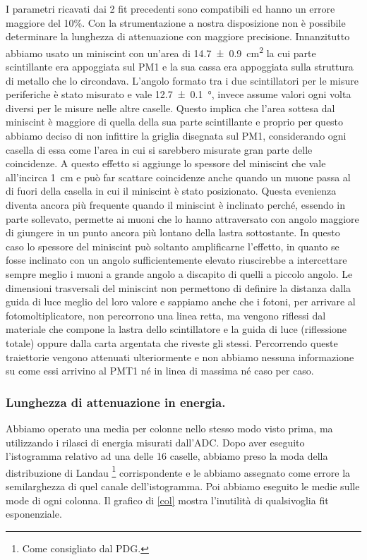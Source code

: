 I parametri ricavati dai 2 fit precedenti sono compatibili ed hanno un errore maggiore del 10\%. Con la strumentazione a nostra disposizione non è possibile determinare la lunghezza di attenuazione con maggiore precisione. Innanzitutto abbiamo usato un miniscint con un'area di \SI{14.7\pm0.9}{cm^2} la cui parte scintillante era appoggiata sul PM1 e la sua cassa  era appoggiata sulla struttura di metallo che lo circondava. L'angolo formato tra i due scintillatori per le misure periferiche è stato misurato e vale \SI{12.7\pm0.1}{\degree}, invece assume valori ogni volta diversi per le misure nelle altre caselle. Questo implica che l'area sottesa dal miniscint è maggiore di quella della sua parte scintillante e proprio per questo abbiamo deciso di non infittire la griglia disegnata sul PM1, considerando ogni casella di essa come l'area in cui si sarebbero misurate gran parte delle coincidenze. A questo effetto si aggiunge lo spessore del miniscint che vale all'incirca \SI{1}{cm} e può far scattare coincidenze anche quando un muone passa al di fuori della casella in cui il miniscint è stato posizionato. Questa evenienza diventa ancora più frequente quando il miniscint è inclinato perché, essendo in parte sollevato, permette ai muoni che lo hanno attraversato con angolo maggiore di giungere in un punto ancora più lontano della lastra sottostante. In questo caso lo spessore del miniscint può soltanto amplificarne l'effetto, in quanto se fosse inclinato con un angolo sufficientemente elevato riuscirebbe a intercettare sempre meglio  i muoni a grande angolo a discapito di quelli a piccolo angolo.
Le dimensioni trasversali del miniscint non permettono di definire la distanza dalla guida di luce meglio del loro valore e sappiamo anche che i fotoni, per arrivare al fotomoltiplicatore,  non percorrono una linea retta, ma vengono riflessi dal materiale che compone la lastra dello scintillatore e la guida di luce (riflessione totale) oppure dalla carta argentata che riveste gli stessi. Percorrendo queste traiettorie vengono attenuati ulteriormente e non abbiamo nessuna informazione su come essi arrivino al PMT1 né in linea di massima né caso per caso.

\subsubsection{Lunghezza di attenuazione in energia.}

Abbiamo operato una media per colonne nello stesso modo visto prima, ma utilizzando i rilasci di energia misurati dall'ADC. Dopo aver eseguito l'istogramma relativo ad una delle 16 caselle, abbiamo preso la moda della distribuzione di Landau%
\footnote{Come consigliato dal PDG.}
corrispondente e le abbiamo assegnato come errore la semilarghezza di quel canale dell'istogramma. Poi abbiamo eseguito le medie sulle mode di ogni colonna.
Il grafico di \autoref{col} mostra l'inutilità di qualsivoglia fit esponenziale.

